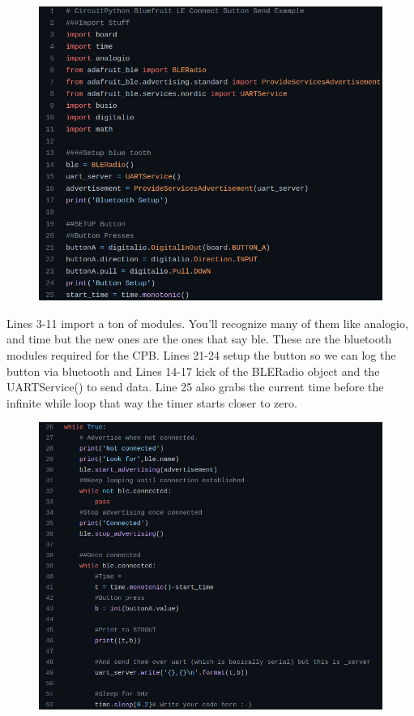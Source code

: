 \begin{figure}[H]
  \begin{center}
    \includegraphics[width=\textwidth]{Figures/bluetooth_code.png}
  \end{center}
\end{figure}
Lines 3-11 import a ton of modules. You'll recognize many of them like
analogio, and time but the new ones are the ones that
say ble. These are the bluetooth modules required for the CPB. Lines
21-24 setup the button so we can log the button via bluetooth and
Lines 14-17 kick of the BLERadio object and the UARTService() to send
data. Line 25 also grabs the current time before the infinite while
loop that way the timer starts closer to zero. 
\begin{figure}[H]
  \begin{center}
    \includegraphics[width=\textwidth]{Figures/bluetooth_code1.png}
  \end{center}
\end{figure}
